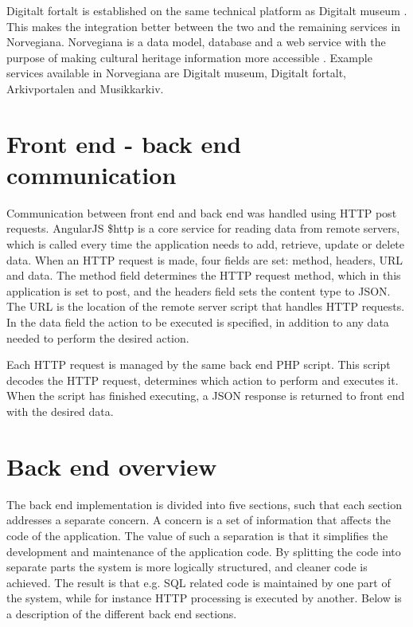 Digitalt fortalt is established on the same technical platform as Digitalt museum \cite{HM2}. This makes the integration better between the two and the remaining services in Norvegiana. Norvegiana is a data model, database and a web service with the purpose of making cultural heritage information more accessible \cite{HM3}. Example services available in Norvegiana are Digitalt museum, Digitalt fortalt, Arkivportalen and Musikkarkiv. 

\section{Front end - back end communication}
\label{subsec:frontend-backend_communication}

Communication between front end and back end was handled using HTTP post requests.
AngularJS \$http is a core service for reading data from remote servers, which is called every time the application needs to add, retrieve, update or delete data. When an HTTP request is made, four fields are set: method, headers, URL and data. The method field determines the HTTP request method, which in this application is set to post, and the headers field sets the content type to JSON. The URL is the location of the remote server script that handles HTTP requests. In the data field the action to be executed is specified, in addition to any data needed to perform the desired action.\newline

Each HTTP request is managed by the same back end PHP script. This script decodes the HTTP request, determines which action to perform and executes it. When the script has finished executing, a JSON response is returned to front end with the desired data.

\section{Back end overview}
The back end implementation is divided into five sections, such that each section addresses a separate concern. A concern is a set of information that affects the code of the application. The value of such a separation is that it simplifies the development and maintenance of the application code. By splitting the code into separate parts the system is more logically structured, and cleaner code is achieved. The result is that e.g. SQL related code is maintained by one part of the system, while for instance HTTP processing is executed by another. Below is a description of the different back end sections.


